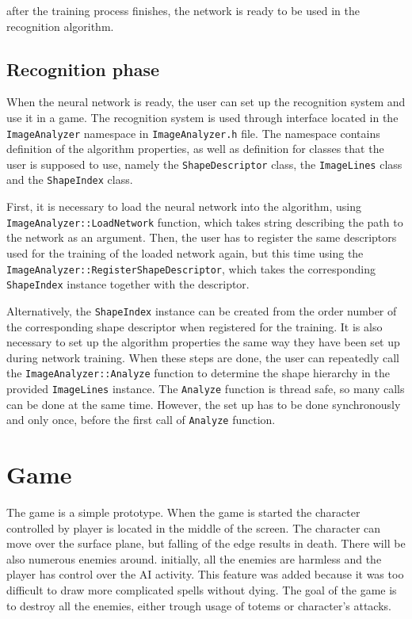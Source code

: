 after the training process finishes, the network is ready to be used in the recognition algorithm.

\subsection{Recognition phase}
When the neural network is ready, the user can set up the recognition system and use it in a game. The recognition system is used through interface located in the \texttt{ImageAnalyzer} namespace in \texttt{ImageAnalyzer.h} file. The namespace contains definition of the algorithm properties, as well as definition for classes that the user is supposed to use, namely the \texttt{ShapeDescriptor} class, the \texttt{ImageLines} class and the \texttt{ShapeIndex} class.

First, it is necessary to load the neural network into the algorithm, using \texttt{ImageAnalyzer::LoadNetwork} function, which takes string describing the path to the network as an argument. Then, the user has to register the same descriptors used for the training of the loaded network again, but this time using the \texttt{ImageAnalyzer::RegisterShapeDescriptor}, which takes the corresponding \texttt{ShapeIndex} instance together with the descriptor.

Alternatively, the \texttt{ShapeIndex} instance can be created from the order number of the corresponding shape descriptor when registered for the training. It is also necessary to set up the algorithm properties the same way they have been set up during network training. When these steps are done, the user can repeatedly call the \texttt{ImageAnalyzer::Analyze} function to determine the shape hierarchy in the provided \texttt{ImageLines} instance. The \texttt{Analyze} function is thread safe, so many calls can be done at the same time. However, the set up has to be done synchronously and only once, before the first call of \texttt{Analyze} function. 

\section{Game}
The game is a simple prototype. When the game is started the character controlled by player is located in the middle of the screen. The character can move over the surface plane, but falling of the edge results in death. There will be also numerous enemies around. initially, all the enemies are harmless and the player has control over the AI activity. This feature was added because it was too difficult to draw more complicated spells without dying. The goal of the game is to destroy all the enemies, either trough usage of totems or character's attacks.

